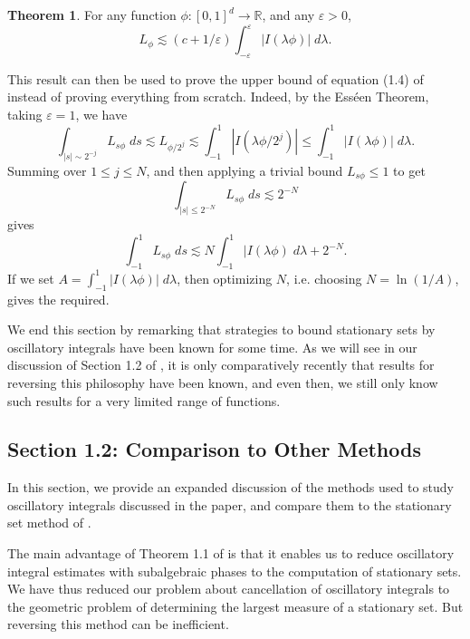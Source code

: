 \documentclass[12pt]{article}
\newcommand{\R}{\mathbb{R}}
\theoremstyle{definition}
\newtheorem{theorem}{Theorem}[section]
\theoremstyle{remark}
\numberwithin{equation}{section}
\begin{document}
\begin{theorem}
    For any function $\phi: [0,1]^d \to \R$, and any $\varepsilon > 0$,
    \[ L_\phi \lesssim (c + 1/\varepsilon) \int_{-\varepsilon}^\varepsilon |I(\lambda \phi)|\; d\lambda. \]
\end{theorem}

This result can then be used to prove the upper bound of equation (1.4) of \cite{BGZZ} instead of proving everything from scratch. Indeed, by the Ess\'{e}en Theorem, taking $\varepsilon = 1$, we have
%
\[ \int_{|s| \sim 2^{-j}} L_{s \phi}\; ds \lesssim L_{\phi / 2^j} \lesssim \int_{-1}^1 |I(\lambda \phi / 2^j)| \leq \int_{-1}^1 |I(\lambda \phi)|\; d\lambda. \]
%
Summing over $1 \leq j \leq N$, and then applying a trivial bound $L_{s \phi} \leq 1$ to get
%
\[ \int_{|s| \leq 2^{-N}} L_{s \phi}\; ds \lesssim 2^{-N} \]
%
gives
%
\[ \int_{-1}^1 L_{s \phi}\; ds \lesssim N \int_{-1}^1 |I(\lambda \phi)\; d\lambda + 2^{-N}. \]
If we set $A = \int_{-1}^1 |I(\lambda \phi)|\; d\lambda$, then optimizing $N$, i.e. choosing $N = \ln(1/A)$, gives the required.

We end this section by remarking that strategies to bound stationary sets by oscillatory integrals have been known for some time. As we will see in our discussion of Section 1.2 of \cite{BGZZ}, it is only comparatively recently that results for reversing this philosophy have been known, and even then, we still only know such results for a very limited range of functions.

\subsection*{Section 1.2: Comparison to Other Methods}

In this section, we provide an expanded discussion of the methods used to study oscillatory integrals discussed in the paper, and compare them to the stationary set method of \cite{BGZZ}.

The main advantage of Theorem 1.1 of \cite{BGZZ} is that it enables us to reduce oscillatory integral estimates with subalgebraic phases to the computation of stationary sets. We have thus reduced our problem about cancellation of oscillatory integrals to the geometric problem of determining the largest measure of a stationary set. But reversing this method can be inefficient. 
\end{document}
